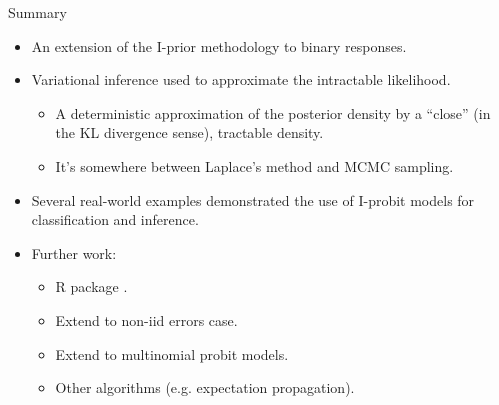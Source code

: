 \begin{frame}{Summary}
  \vspace{-10pt}
  \begin{itemize}\setlength\itemsep{0.8em}
    \item An extension of the I-prior methodology to binary responses.
    \item Variational inference used to approximate the intractable likelihood.
    \begin{itemize}
      \item A deterministic approximation of the posterior density by a ``close'' (in the KL divergence sense), tractable density.
      \item It's somewhere between Laplace's method and MCMC sampling.
    \end{itemize}
    \item Several real-world examples demonstrated the use of I-probit models for classification and inference.
    \item Further work:
    \begin{itemize}
      \item R package .
      \item Extend to non-iid errors case.
      \item Extend to multinomial probit models.
      \item Other algorithms (e.g. expectation propagation).
    \end{itemize}
  \end{itemize}
\end{frame}
